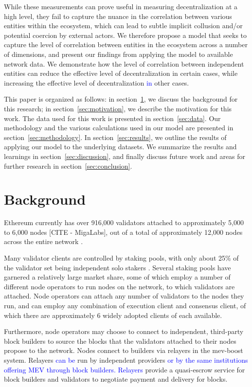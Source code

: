 \documentclass[conference]{IEEEtran}
\newcommand{\leo}[1]{\textcolor{blue}{#1}}
\begin{document}
While these measurements can prove useful in measuring decentralization at a high level, they fail to capture the nuance in the correlation between various entities within the ecosystem, which can lead to subtle implicit collusion and/or potential coercion by external actors.  We therefore propose a model that seeks to capture the level of correlation between entities in the ecosystem across a number of dimensions, and present our findings from applying the model to available network data.  We demonstrate how the level of correlation between independent entities can reduce the effective level of decentralization in certain cases, while increasing the effective level of decentralization \leo{in} other cases.

This paper is organized as follows: in section~\ref{ sec:background}, we discuss the background for this research; in section~\ref{sec:motivation}, we describe the motivation for this work. The data used for this work is presented in section~\ref{sec:data}. Our methodology and the various calculations used in our model are presented in section~\ref{sec:methodology}.  In section~\ref{sec:results}, we outline the results of applying our model to the underlying datasets. We summarize the results and learnings in section~\ref{sec:discussion}, and finally discuss future work and areas for further research in section~\ref{sec:conclusion}.

\section{Background}
\label{ sec:background}

Ethereum currently has over 916,000 validators \cite{beaconchain2024} attached to approximately 5,000 to 6,000 nodes [CITE - MigaLabs], out of a total of approximately 12,000 nodes across the entire network \cite{nodewatch2024}.

Many validator clients are controlled by staking pools, with only about 25\% of the validator set being independent solo stakers \cite{dune2024}.  Several staking pools have garnered a relatively large market share, some of which employ a number of different node operators to run nodes on the network, to which validators are attached.  Node operators can attach any number of validators to the nodes they run, and can employ any combination of execution client and consensus client, of which there are approximately 6 widely adopted clients of each available.

Furthermore, node operators may choose to connect to independent, third-party block builders to source the blocks that the validators attached to their nodes propose to the network. Nodes connect to builders via relayers in the mev-boost system.  Relayers \leo{can be} run by independent providers \leo{or by the same institutions offering MEV through block builders. Relayers} provide a quasi-escrow service for block builders and validators to negotiate payment and delivery for blocks.
\end{document}
